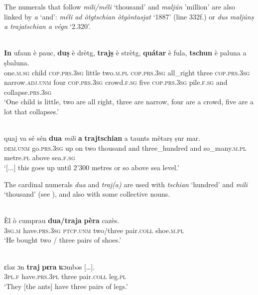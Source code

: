 The numerals that follow \textit{mili/méli} `thousand' and \textit{maljún} 'million' are also linked by \textit{a} `and': \textit{méli ad òtgtschian òtgòntasjat} `1887' (line 332f.) or \textit{dus maljúnṣ a trajatschian a végn} `2.320'.

\ea

\\
\gll  \textbf{In} ufaun è pauc, \textbf{duṣ} è drètg, \textbf{trajṣ} è strètg, \textbf{quátar} è fula, \textbf{tschun} è paluna a ṣbaluna.\\
one.\textsc{m.sg} child \textsc{cop.prs.3sg} little two.\textsc{m.pl} \textsc{cop.prs.3sg} all\_right three \textsc{cop.prs.3sg} narrow.\textsc{adj.unm} four \textsc{cop.prs.3sg} crowd.\textsc{f.sg} five \textsc{cop.prs.3sg} pile.\textsc{f.sg} and  collapse.\textsc{prs.3sg}\\
\glt `One child is little, two are all right, three are narrow, four are a crowd, five are a lot that collapses.'
\z

\ea
{}\\
\gll  [...] quaj va\footnotemark{} sé sén \textbf{dua} \textit{mili} \textbf{a} \textbf{trajtschian} a taunts mètarṣ ṣur mar. \\
{} \textsc{dem.unm} go.\textsc{prs.3sg} up on two thousand and three\_hundred and  so\_many.\textsc{m.pl} metre.\textsc{pl} above sea.\textsc{f.sg}\\
\glt `[...] this goes up until 2'300 metres or so above sea level.'
\z

The cardinal numerals \textit{dua} and  \textit{traj(a)} are used with \textit{tschian} `hundred' and \textit{mili} `thousand' (see ), and also with some collective nouns.

\ea

\\
\gll Èl ò cumprau \textbf{dua/traja} \textbf{pèra} cazès.\\
\textsc{3sg.m} have.\textsc{prs.3sg} \textsc{ptcp.unm} two/three pair.\textsc{coll} shoe.\textsc{m.pl}\\
\glt `He bought two / three pairs of shoes.'
\z

\ea

\\
\gll    ɛləz ɔn \textbf{traj} \textbf{pɛra} ʨɔmbəs […].\\
    \textsc{3pl.f} have.\textsc{prs.3pl} three pair.\textsc{coll} leg.\textsc{pl}\\
\glt `They [the ants] have three pairs of legs.'
\z

